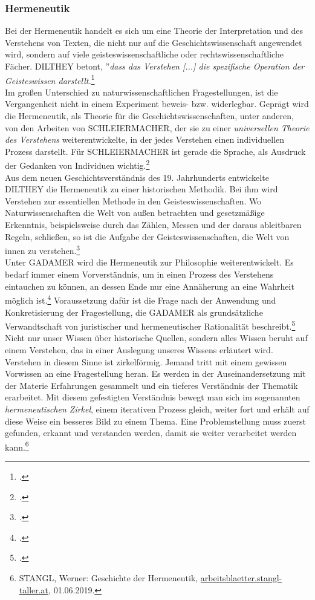 \documentclass[12pt,a4paper]{article}
\begin{document}
\subsubsection{Hermeneutik}

Bei der Hermeneutik handelt es sich um eine Theorie der Interpretation und des Verstehens von Texten, die nicht nur auf die Geschichtswissenschaft angewendet wird, sondern auf viele geisteswissenschaftliche oder rechtswissenschaftliche Fächer.
DILTHEY betont, ''\textit{dass das Verstehen [...] die spezifische Operation der Geisteswissen darstellt.}\footcite[][S.82]{ficara2015hermeneutik}
\\
Im großen Unterschied zu naturwissenschaftlichen Fragestellungen, ist die Vergangenheit nicht in einem Experiment beweis- bzw. widerlegbar. Geprägt wird die Hermeneutik, als Theorie für die Geschichtswissenschaften, unter anderen, von den Arbeiten von SCHLEIERMACHER, der sie zu einer \textit{universellen Theorie des Verstehens} weiterentwickelte, in der jedes Verstehen einen individuellen Prozess darstellt. Für SCHLEIERMACHER ist gerade die Sprache, als Ausdruck der Gedanken von Individuen wichtig.\footcite[][S.72-81]{ficara2015hermeneutik} 
\\
Aus dem neuen Geschichtsverständnis des 19. Jahrhunderts entwickelte DILTHEY die Hermeneutik zu einer historischen Methodik. Bei ihm wird Verstehen zur essentiellen Methode in den Geisteswissenschaften. Wo Naturwissenschaften die Welt von außen betrachten und gesetzmäßige Erkenntnis, beispielsweise durch das Zählen, Messen und der daraus ableitbaren Regeln, schließen, so ist die Aufgabe der Geisteswissenschaften, die Welt von innen zu verstehen.\footcite[][S.82-83]{ficara2015hermeneutik}
\\
Unter GADAMER wird die Hermeneutik zur Philosophie weiterentwickelt. Es bedarf immer einem Vorverständnis, um in einen Prozess des Verstehens eintauchen zu können, an dessen Ende nur eine Annäherung an eine Wahrheit möglich ist.\footcite[][S.19-30]{schulz2010neuere} Voraussetzung dafür ist die Frage nach der Anwendung und Konkretisierung der Fragestellung, die GADAMER als grundsätzliche Verwandtschaft von juristischer und hermeneutischer Rationalität beschreibt.\footcite[][S.176-178]{ficara2015hermeneutik}
\\
Nicht nur unser Wissen über historische Quellen, sondern alles Wissen beruht auf einem Verstehen, das in einer Auslegung unseres Wissens erläutert wird. Verstehen in diesem Sinne ist zirkelförmig. Jemand tritt mit einem gewissen Vorwissen an eine Fragestellung heran. Es werden in der Auseinandersetzung mit der Materie Erfahrungen gesammelt und ein tieferes Verständnis der Thematik erarbeitet. Mit diesem gefestigten Verständnis bewegt man sich im sogenannten  \textit{hermeneutischen Zirkel}, einem iterativen Prozess gleich, weiter fort und erhält auf diese Weise ein besseres Bild zu einem Thema. Eine Problemstellung muss zuerst gefunden, erkannt und verstanden werden, damit sie weiter verarbeitet werden kann.\footnote{STANGL, Werner: Geschichte der Hermeneutik, \protect\url{arbeitsblaetter.stangl-taller.at}, 01.06.2019.}
\end{document}
